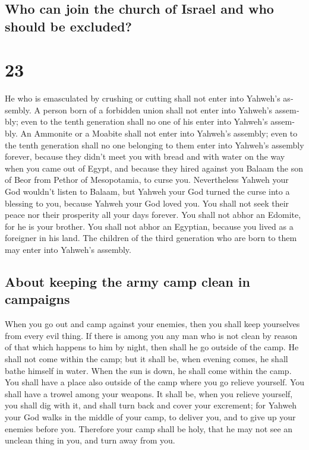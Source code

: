\begin{paracol}{2}
\begin{otherlanguage}{english}
\hypertarget{who-can-join-the-church-of-israel-and-who-should-be-excluded}{%
\subsection{Who can join the church of Israel and who should be
excluded?}\label{who-can-join-the-church-of-israel-and-who-should-be-excluded}}

\hypertarget{section-45}{%
\section{23}\label{section-45}}

 He who is emasculated by crushing or cutting shall not
enter into Yahweh's assembly.  A person born of a
forbidden union shall not enter into Yahweh's assembly; even to the
tenth generation shall no one of his enter into Yahweh's assembly.
 An Ammonite or a Moabite shall not enter into Yahweh's
assembly; even to the tenth generation shall no one belonging to them
enter into Yahweh's assembly forever,  because they didn't
meet you with bread and with water on the way when you came out of
Egypt, and because they hired against you Balaam the son of Beor from
Pethor of Mesopotamia, to curse you.  Nevertheless Yahweh
your God wouldn't listen to Balaam, but Yahweh your God turned the curse
into a blessing to you, because Yahweh your God loved you.
 You shall not seek their peace nor their prosperity all
your days forever.  You shall not abhor an Edomite, for he
is your brother. You shall not abhor an Egyptian, because you lived as a
foreigner in his land.  The children of the third
generation who are born to them may enter into Yahweh's assembly.

\hypertarget{about-keeping-the-army-camp-clean-in-campaigns}{%
\subsection{About keeping the army camp clean in
campaigns}\label{about-keeping-the-army-camp-clean-in-campaigns}}

 When you go out and camp against your enemies, then you
shall keep yourselves from every evil thing.  If there is
among you any man who is not clean by reason of that which happens to
him by night, then shall he go outside of the camp. He shall not come
within the camp;  but it shall be, when evening comes, he
shall bathe himself in water. When the sun is down, he shall come within
the camp.  You shall have a place also outside of the
camp where you go relieve yourself.  You shall have a
trowel among your weapons. It shall be, when you relieve yourself, you
shall dig with it, and shall turn back and cover your excrement;
 for Yahweh your God walks in the middle of your camp, to
deliver you, and to give up your enemies before you. Therefore your camp
shall be holy, that he may not see an unclean thing in you, and turn
away from you.


\end{otherlanguage}
\end{paracol}
